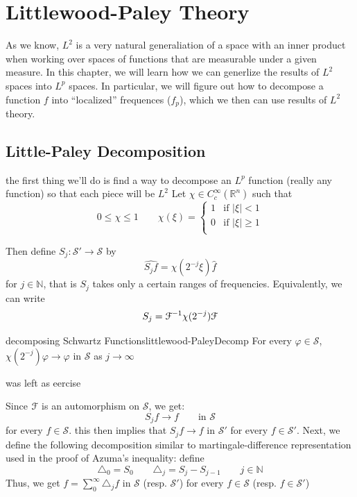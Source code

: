 \documentclass{book}
\newenvironment{Proof}[1][]
  {\begin{ProofTcb}[#1]}
  {\end{ProofTcb}}
\newcommand{\N}{{\mathbb{N}}}
\newcommand{\R}{{\mathbb{R}}}
\newcommand{\CS}{{\mathcal{S}}}
\newcommand{\EF}{{\EuScript{F}}}
\renewcommand{\phi}{\varphi}
\newcommand{\rw}{\rightarrow}
\begin{document}
\chapter{Littlewood-Paley Theory}

As we know, $L^2$ is a very natural generaliation of a space with an inner product when working over spaces of functions
that are measurable under a given measure. In this chapter, we will learn how we can generlize the results of $L^2$
spaces into $L^p$ spaces. In particular, we will figure out how to decompose a function $f$ into ``localized''
frequences ($f_p$), which we then can use results of $L^2$ theory.

\section{Little-Paley Decomposition}

the first thing we'll do is find a way to decompose an $L^p$ function (really any function) so that each piece will be
$L^2$ Let $\chi \in C_c^\infty(\R^n)$ such that
\[
	0\le \chi \le 1 \qquad \chi(\xi) = \begin{cases}
		1 & \text{if $|\xi| < 1$}\\
		0 & \text{if $|\xi| \ge 1$}\\
	\end{cases}
\]

Then define $S_j: \CS' \rw \CS$ by
\[
	\widehat{S_j f} = \chi(2^{-j}\xi)\hat{f}
\]
for $j \in\N$, that is $S_j$ takes only a certain ranges of frequencies. Equivalently, we can write
\[
	S_j = \EF^{-1}\chi(2^{-j})\EF
\]

\begin{lem}{decomposing Schwartz Functions}{littlewood-PaleyDecomp}
	For every $\phi \in \CS$, $\chi(2^{-j})\phi \rw \phi$ in $\CS$ as $j \rw \infty$
\end{lem}

\begin{Proof}
	was left as eercise
\end{Proof}

Since $\EF$ is an automorphism on $\CS$, we get:
\[
	S_j f \rw f \qquad \text{in $\CS$}
\]
for every $f \in \CS$. this then implies that $S_jf \rw f$ in $\CS'$ for every $f \in \CS'$. Next, we define the
following decomposition similar to martingale-difference representation used in the proof of Azuma's inequality: define
\[
	\triangle_0 = S_0 \qquad \triangle_j = S_j - S_{j-1} \qquad j \in \N
\]
Thus, we get $f = \sum_0^\infty \triangle_j f$ in $\CS$ (resp. $\CS'$) for every $f \in \CS$ (resp. $f \in \CS'$)
\end{document}
